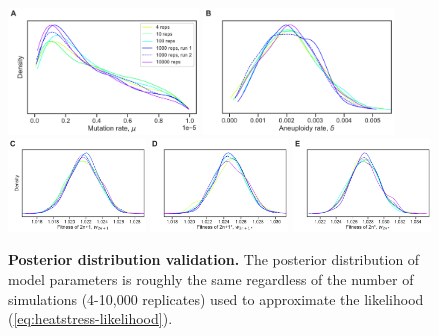 \documentclass[12pt]{extarticle}
\begin{document}
\begin{figure}[h]
    \centering
      \includegraphics[width=0.45\textwidth]{../figures/runs-A.pdf}      
      \includegraphics[width=0.45\textwidth]{../figures/runs-B.pdf}    
      \includegraphics[width=0.325\textwidth]{../figures/runs-C.pdf}      
      \includegraphics[width=0.325\textwidth]{../figures/runs-D.pdf}      
      \includegraphics[width=0.325\textwidth]{../figures/runs-E.pdf} 
       \caption{
    \textbf{Posterior distribution validation.}
    The posterior distribution of model parameters is roughly the same regardless of the number of simulations (4-10,000 replicates) used to approximate the likelihood (\cref{eq:heatstress-likelihood}).
    } 
     
     \label{fig:seeds}
 \end{figure}
 
\end{document}

